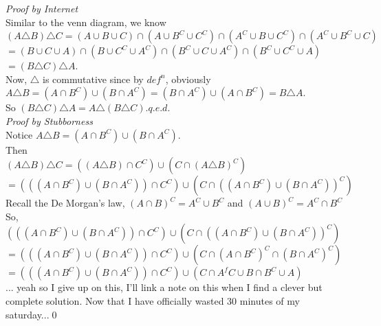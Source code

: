 \documentclass[12pt]{book}
\begin{document}
\noindent \textit{Proof by Internet}\\
Similar to the venn diagram, we know\\
$(A \triangle B) \triangle C = (A \cup B \cup C) \cap (A \cup B^{C} \cup C^{C}) \cap (A^{C} \cup B \cup C^{C}) \cap (A^{C} \cup B^{C} \cup C)$\\
$= (B \cup C \cup A) \cap (B \cup C^{C} \cup A^{C}) \cap (B^{C} \cup C \cup A^{C}) \cap (B^{C} \cup C^{C} \cup A)$\\
$=(B \triangle C) \triangle A$.\\

Now, $\triangle$ is commutative since by $def^n$, obviously \\
$A\triangle B=(A\cap B^{C}) \cup (B \cap A^{C})= (B \cap A^{C}) \cup (A\cap B^{C}) = B\triangle A$.\\
\noindent So $(B \triangle C) \triangle A = A \triangle (B \triangle C)$.\hfill$q.e.d.$\\

\noindent \textit{Proof by Stubborness}\\
\noindent Notice $A\triangle B=(A\cap B^{C}) \cup (B \cap A^{C})$.\\

\noindent Then \\
$(A \triangle B) \triangle C = ((A \triangle B)\cap C^{C}) \cup (C \cap (A \triangle B)^{C})$\\
$=(((A\cap B^{C}) \cup (B \cap A^{C}))\cap C^{C}) \cup (C \cap ((A\cap B^{C}) \cup (B \cap A^{C}))^{C})$\\

\noindent Recall the De Morgan's law, $(A \cap B)^{C}= A^{C} \cup B^{C}$ and $(A \cup B)^{C}= A^{C} \cap B^{C}$\\

\noindent So, \\
$(((A\cap B^{C}) \cup (B \cap A^{C}))\cap C^{C}) \cup (C \cap ((A\cap B^{C}) \cup (B \cap A^{C}))^{C})$\\
$=(((A\cap B^{C}) \cup (B \cap A^{C}))\cap C^{C}) \cup (C \cap (A\cap B^{C})^{C} \cap (B \cap A^{C})^{C})$\\
$=(((A\cap B^{C}) \cup (B \cap A^{C}))\cap C^{C}) \cup (C \cap A^f{C} \cup B \cap B^{C} \cup A)$\\

\noindent ... yeah so I give up on this, I'll link a note on this when I find a clever but complete solution. Now that I have officially wasted 30 minutes of my saturday...\qed
\end{document}
